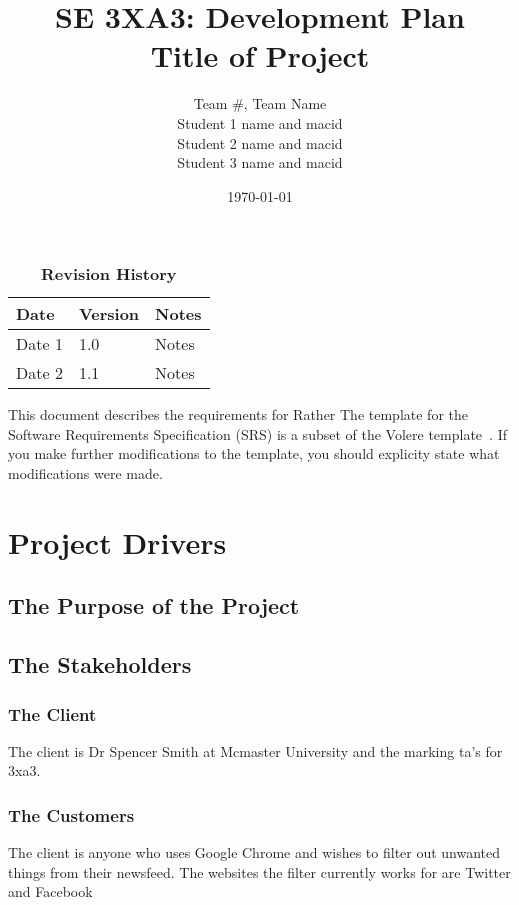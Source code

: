 \documentclass[12pt, titlepage]{article}
\title{SE 3XA3: Development Plan\\Title of Project}
\author{Team \#, Team Name
		\\ Student 1 name and macid
		\\ Student 2 name and macid
		\\ Student 3 name and macid
}
\date{\today}
\begin{document}
\maketitle

\tableofcontents
\listoftables
\listoffigures

\begin{table}[bp]
\caption{\bf Revision History}
\begin{tabularx}{\textwidth}{p{3cm}p{2cm}X}
\toprule {\bf Date} & {\bf Version} & {\bf Notes}\\
\midrule
Date 1 & 1.0 & Notes\\
Date 2 & 1.1 & Notes\\
\bottomrule
\end{tabularx}
\end{table}

\newpage


This document describes the requirements for Rather  The template for the Software
Requirements Specification (SRS) is a subset of the Volere
template~\citep{RobertsonAndRobertson2012}.  If you make further modifications
to the template, you should explicity state what modifications were made.

\section{Project Drivers}

\subsection{The Purpose of the Project}

\subsection{The Stakeholders}

\subsubsection{The Client}
The client is Dr Spencer Smith at Mcmaster University and the marking ta's for 3xa3. 

\subsubsection{The Customers}
The client is anyone who uses Google Chrome and wishes to filter out unwanted things from their newsfeed. The websites the filter currently works for are Twitter and Facebook
\end{document}
